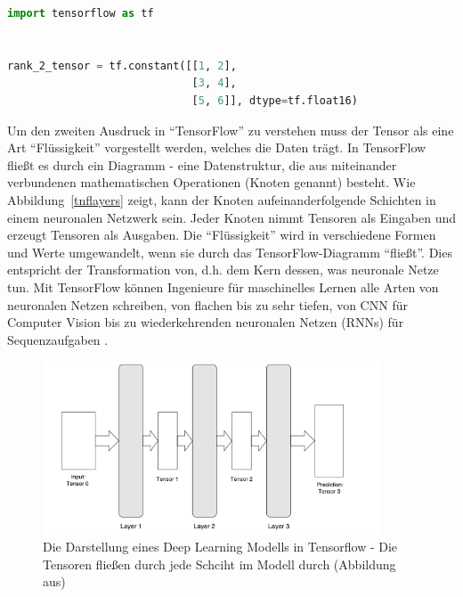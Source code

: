 \begin{lstlisting}[language=Python,caption=Beispiel eines Tensors in TensorFlow]
import tensorflow as tf


rank_2_tensor = tf.constant([[1, 2],
                             [3, 4],
                             [5, 6]], dtype=tf.float16)
\end{lstlisting}\label{Label3}

Um den zweiten Ausdruck in \enquote{TensorFlow} zu verstehen muss der Tensor als eine Art \enquote{Flüssigkeit} vorgestellt werden, welches die Daten trägt. In TensorFlow fließt es durch ein Diagramm - eine Datenstruktur, die aus miteinander verbundenen mathematischen Operationen (Knoten genannt) besteht. Wie Abbildung~\ref{tnflayers} zeigt, kann der Knoten aufeinanderfolgende Schichten in einem neuronalen Netzwerk sein. Jeder Knoten nimmt Tensoren als Eingaben und erzeugt Tensoren als Ausgaben. Die \enquote{Flüssigkeit} wird in verschiedene Formen und Werte umgewandelt, wenn sie durch das TensorFlow-Diagramm \enquote{fließt}. Dies entspricht der Transformation von, d.h. dem Kern dessen, was neuronale Netze tun. Mit TensorFlow können Ingenieure für maschinelles Lernen alle Arten von neuronalen Netzen schreiben, von flachen bis zu sehr tiefen, von CNN für Computer Vision bis zu wiederkehrenden neuronalen Netzen (RNNs) für Sequenzaufgaben .

 \begin{figure}[H]
     \centering
     \includegraphics[width=10cm]{kapitel5/tflayers.png}
     \caption[Die Darstellung eines Deep Learning Modells in Tensorflow]{Die Darstellung eines Deep Learning Modells in Tensorflow - Die Tensoren fließen durch jede Schciht im Modell durch (Abbildung aus)}
     \label{Kap5:tnflayers}
 \end{figure}


